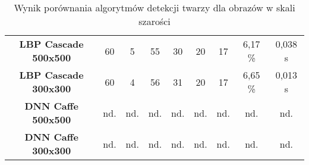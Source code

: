 \begin{table}[H]
{\begin{tabular}{|ccccccccc|}
\textbf{LBP Cascade 500x500} &
  60 &
  5 &
  55 &
  30 &
  20 &
  17 &
  6,17 \% &
  0,038 s \\
  
\rowcolor[HTML]{C0C0C0} 
\textbf{LBP Cascade 300x300} &
  60 &
  4 &
  56 &
  31 &
  20 &
  17 &
  6,65 \% &
  0,013 s \\
  
\textbf{DNN Caffe 500x500} &
  nd. &
  nd. &
  nd. &
  nd. &
  nd. &
  nd. &
  nd. &
  nd. \\
  
\rowcolor[HTML]{C0C0C0} 
\textbf{DNN Caffe 300x300} &
  nd. &
  nd. &
  nd. &
  nd. &
  nd. &
  nd. &
  nd. &
  nd. \\
  
  \hline
\end{tabular}%
}
\begin{center}
    \caption{Wynik porównania algorytmów detekcji twarzy dla obrazów w skali szarości}
\end{center}

\label{tab:face_detect_result_GRAY}
\end{table}